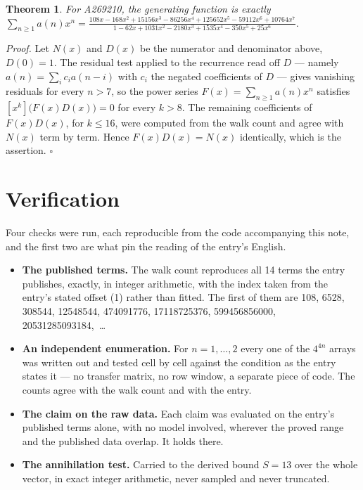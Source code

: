 \documentclass[11pt]{article}
\newtheorem{theorem}{Theorem}
\theoremstyle{definition}
\begin{document}
\begin{theorem} For A269210, the generating function is exactly $\sum_{n\ge 1} a(n)x^n = \frac{108x - 168x^{2} + 15156x^{3} - 86256x^{4} + 125652x^{5} - 59112x^{6} + 10764x^{7}}{1 - 62x + 1031x^{2} - 2180x^{3} + 1535x^{4} - 350x^{5} + 25x^{6}}$.\end{theorem}

{\itshape Proof.} Let $N(x)$ and $D(x)$ be the numerator and denominator above, $D(0)=1$. The residual test applied to the recurrence read off $D$ --- namely $a(n) = \sum_i c_i a(n-i)$ with $c_i$ the negated coefficients of $D$ --- gives vanishing residuals for every $n > 7$, so the power series $F(x)=\sum_{n\ge 1}a(n)x^n$ satisfies $[x^k]\bigl(F(x)D(x)\bigr) = 0$ for every $k > 8$. The remaining coefficients of $F(x)D(x)$, for $k \le 16$, were computed from the walk count and agree with $N(x)$ term by term. Hence $F(x)D(x) = N(x)$ identically, which is the assertion. $\square$

\section{Verification}

Four checks were run, each reproducible from the code accompanying this note, and the first two are what pin the reading of the entry's English.

\begin{itemize}

\item {\bfseries The published terms.} The walk count reproduces all 14 terms the entry publishes, exactly, in integer arithmetic, with the index taken from the entry's stated offset (1) rather than fitted. The first of them are 108, 6528, 308544, 12548544, 474091776, 17118725376, 599456856000, 20531285093184,~\dots

\item {\bfseries An independent enumeration.} For $n = 1,\dots,2$ every one of the $4^{4n}$ arrays was written out and tested cell by cell against the condition as the entry states it --- no transfer matrix, no row window, a separate piece of code. The counts agree with the walk count and with the entry.

\item {\bfseries The claim on the raw data.} Each claim was evaluated on the entry's published terms alone, with no model involved, wherever the proved range and the published data overlap. It holds there.

\item {\bfseries The annihilation test.} Carried to the derived bound $S = 13$ over the whole vector, in exact integer arithmetic, never sampled and never truncated.

\end{itemize}
\end{document}
